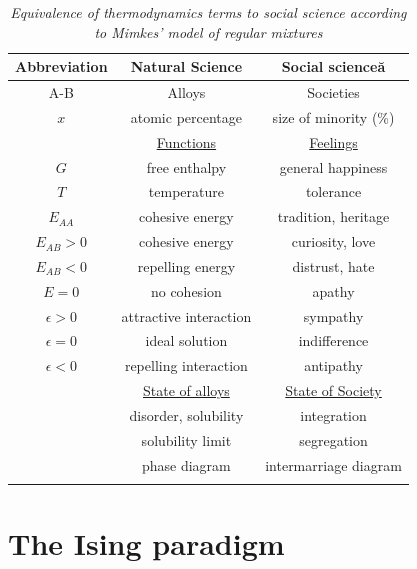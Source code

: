 \documentclass[12pt,openright,twoside]{book}
\begin{document}
\begin{table}[!ht]
\centering
\begin{small}
\caption{\textit{Equivalence of thermodynamics terms to social science according to Mimkes' model of regular mixtures}}
\begin{tabular}{ccc}

\hline\hline
Abbreviation  & Natural Science & Social science\u{a}      \\
\hline
A-B           & Alloys                  & Societies   \\
$x$           & atomic percentage       & size of minority (\%)  \\
              & \underline{Functions}   & \underline{Feelings} \\
$G$           & free enthalpy           & general happiness   \\
$T$           & temperature             & tolerance  \\
$E_{AA}$      & cohesive energy         & tradition, heritage\\
$E_{AB}>0$    & cohesive energy         & curiosity, love   \\
$E_{AB}<0$    & repelling energy        & distrust, hate  \\
$E=0$         & no cohesion             & apathy  \\
$\epsilon>0$  & attractive interaction  & sympathy  \\
$\epsilon=0$  & ideal solution          & indifference          \\
$\epsilon<0$  & repelling interaction   & antipathy  \\
              & \underline{State of alloys}         & \underline{State of Society}  \\
              & disorder, solubility    & integration  \\
              & solubility limit        & segregation  \\
              & phase diagram           & intermarriage diagram  \\

\hline \label{mimkes}
\end{tabular}
\end{small}
\end{table}




\section{The Ising paradigm}
\end{document}
